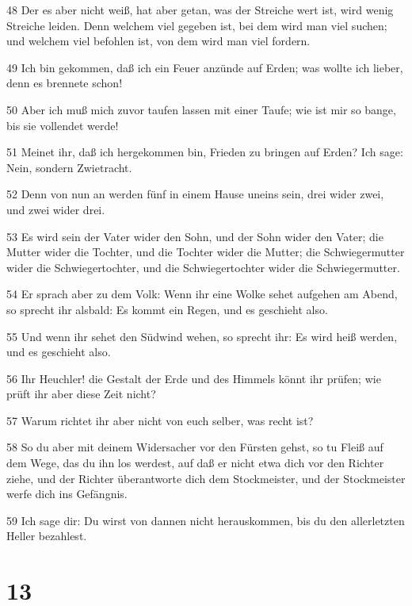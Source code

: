 \par 48 Der es aber nicht weiß, hat aber getan, was der Streiche wert ist, wird wenig Streiche leiden. Denn welchem viel gegeben ist, bei dem wird man viel suchen; und welchem viel befohlen ist, von dem wird man viel fordern.
\par 49 Ich bin gekommen, daß ich ein Feuer anzünde auf Erden; was wollte ich lieber, denn es brennete schon!
\par 50 Aber ich muß mich zuvor taufen lassen mit einer Taufe; wie ist mir so bange, bis sie vollendet werde!
\par 51 Meinet ihr, daß ich hergekommen bin, Frieden zu bringen auf Erden? Ich sage: Nein, sondern Zwietracht.
\par 52 Denn von nun an werden fünf in einem Hause uneins sein, drei wider zwei, und zwei wider drei.
\par 53 Es wird sein der Vater wider den Sohn, und der Sohn wider den Vater; die Mutter wider die Tochter, und die Tochter wider die Mutter; die Schwiegermutter wider die Schwiegertochter, und die Schwiegertochter wider die Schwiegermutter.
\par 54 Er sprach aber zu dem Volk: Wenn ihr eine Wolke sehet aufgehen am Abend, so sprecht ihr alsbald: Es kommt ein Regen, und es geschieht also.
\par 55 Und wenn ihr sehet den Südwind wehen, so sprecht ihr: Es wird heiß werden, und es geschieht also.
\par 56 Ihr Heuchler! die Gestalt der Erde und des Himmels könnt ihr prüfen; wie prüft ihr aber diese Zeit nicht?
\par 57 Warum richtet ihr aber nicht von euch selber, was recht ist?
\par 58 So du aber mit deinem Widersacher vor den Fürsten gehst, so tu Fleiß auf dem Wege, das du ihn los werdest, auf daß er nicht etwa dich vor den Richter ziehe, und der Richter überantworte dich dem Stockmeister, und der Stockmeister werfe dich ins Gefängnis.
\par 59 Ich sage dir: Du wirst von dannen nicht herauskommen, bis du den allerletzten Heller bezahlest.

\chapter{13}

